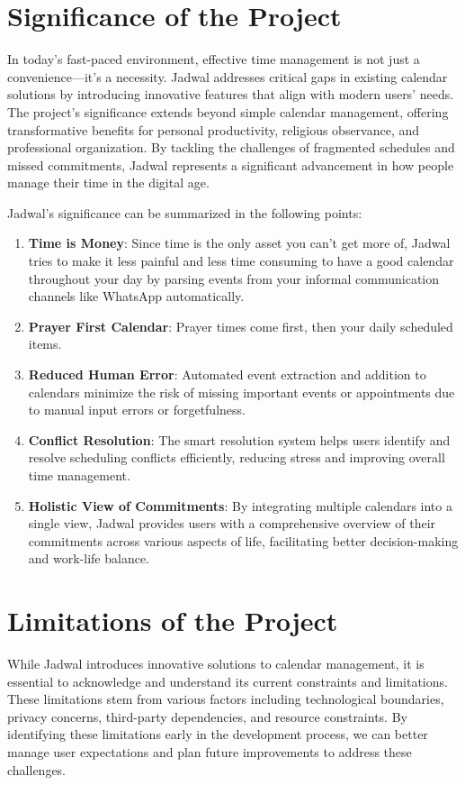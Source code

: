 \documentclass[12pt,a4paper]{report}
\begin{document}
\section{Significance of the Project}

In today's fast-paced environment, effective time management is not just a convenience—it's a necessity. Jadwal addresses critical gaps in existing calendar solutions by introducing innovative features that align with modern users' needs. The project's significance extends beyond simple calendar management, offering transformative benefits for personal productivity, religious observance, and professional organization. By tackling the challenges of fragmented schedules and missed commitments, Jadwal represents a significant advancement in how people manage their time in the digital age.

Jadwal's significance can be summarized in the following points:
\begin{enumerate}
    \item \textbf{Time is Money}: Since time is the only asset you can't get more of, Jadwal tries to make it less painful and less time consuming to have a good calendar throughout your day by parsing events from your informal communication channels like WhatsApp automatically.
    \item \textbf{Prayer First Calendar}: Prayer times come first, then your daily scheduled items.
    \item \textbf{Reduced Human Error}: Automated event extraction and addition to calendars minimize the risk of missing important events or appointments due to manual input errors or forgetfulness.
    \item \textbf{Conflict Resolution}: The smart resolution system helps users identify and resolve scheduling conflicts efficiently, reducing stress and improving overall time management.
    \item \textbf{Holistic View of Commitments}: By integrating multiple calendars into a single view, Jadwal provides users with a comprehensive overview of their commitments across various aspects of life, facilitating better decision-making and work-life balance.
\end{enumerate}

\section{Limitations of the Project}

While Jadwal introduces innovative solutions to calendar management, it is essential to acknowledge and understand its current constraints and limitations. These limitations stem from various factors including technological boundaries, privacy concerns, third-party dependencies, and resource constraints. By identifying these limitations early in the development process, we can better manage user expectations and plan future improvements to address these challenges.
\end{document}
